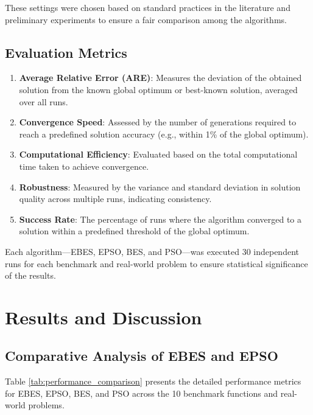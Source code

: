 \documentclass[conference]
{IEEEtran}
\begin{document}
These settings were chosen based on standard practices in the literature and preliminary experiments to ensure a fair comparison among the algorithms.

\subsection{Evaluation Metrics}

\begin{enumerate}
    \item \textbf{Average Relative Error (ARE)}: Measures the deviation of the obtained solution from the known global optimum or best-known solution, averaged over all runs.
    \item \textbf{Convergence Speed}: Assessed by the number of generations required to reach a predefined solution accuracy (e.g., within 1\% of the global optimum).
    \item \textbf{Computational Efficiency}: Evaluated based on the total computational time taken to achieve convergence.
    \item \textbf{Robustness}: Measured by the variance and standard deviation in solution quality across multiple runs, indicating consistency.
    \item \textbf{Success Rate}: The percentage of runs where the algorithm converged to a solution within a predefined threshold of the global optimum.
\end{enumerate}

Each algorithm—EBES, EPSO, BES, and PSO—was executed 30 independent runs for each benchmark and real-world problem to ensure statistical significance of the results.

\section{Results and Discussion}

\subsection{Comparative Analysis of EBES and EPSO}

Table \ref{tab:performance_comparison} presents the detailed performance metrics for EBES, EPSO, BES, and PSO across the 10 benchmark functions and real-world problems.
\end{document}
